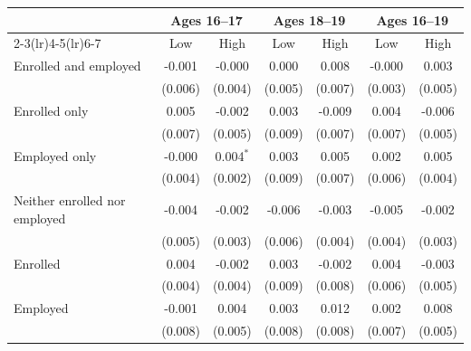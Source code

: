 \begin{tabular}{lcccccc}
\toprule
 & \multicolumn{2}{c}{Ages 16--17} & \multicolumn{2}{c}{Ages 18--19} & \multicolumn{2}{c}{Ages 16--19} \\
\cmidrule(lr){2-3}\cmidrule(lr){4-5}\cmidrule(lr){6-7}
 & Low & High & Low & High & Low & High \\
\midrule
Enrolled and employed & -0.001 & -0.000 & 0.000 & 0.008 & -0.000 & 0.003 \\
 & (0.006) & (0.004) & (0.005) & (0.007) & (0.003) & (0.005) \\
Enrolled only & 0.005 & -0.002 & 0.003 & -0.009 & 0.004 & -0.006 \\
 & (0.007) & (0.005) & (0.009) & (0.007) & (0.007) & (0.005) \\
Employed only & -0.000 & 0.004$^{*}$ & 0.003 & 0.005 & 0.002 & 0.005 \\
 & (0.004) & (0.002) & (0.009) & (0.007) & (0.006) & (0.004) \\
Neither enrolled nor employed & -0.004 & -0.002 & -0.006 & -0.003 & -0.005 & -0.002 \\
 & (0.005) & (0.003) & (0.006) & (0.004) & (0.004) & (0.003) \\
Enrolled & 0.004 & -0.002 & 0.003 & -0.002 & 0.004 & -0.003 \\
 & (0.004) & (0.004) & (0.009) & (0.008) & (0.006) & (0.005) \\
Employed & -0.001 & 0.004 & 0.003 & 0.012 & 0.002 & 0.008 \\
 & (0.008) & (0.005) & (0.008) & (0.008) & (0.007) & (0.005) \\
\bottomrule
\end{tabular}
